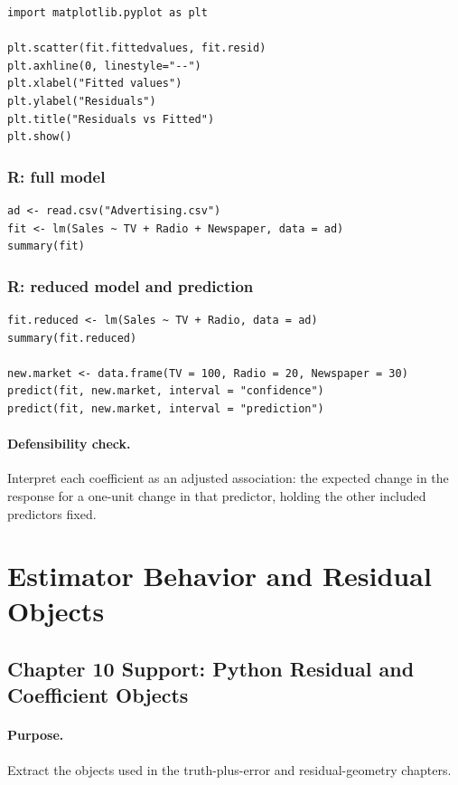 \begin{verbatim}
import matplotlib.pyplot as plt

plt.scatter(fit.fittedvalues, fit.resid)
plt.axhline(0, linestyle="--")
plt.xlabel("Fitted values")
plt.ylabel("Residuals")
plt.title("Residuals vs Fitted")
plt.show()
\end{verbatim}

\subsubsection*{R: full model}

\begin{verbatim}
ad <- read.csv("Advertising.csv")
fit <- lm(Sales ~ TV + Radio + Newspaper, data = ad)
summary(fit)
\end{verbatim}

\subsubsection*{R: reduced model and prediction}

\begin{verbatim}
fit.reduced <- lm(Sales ~ TV + Radio, data = ad)
summary(fit.reduced)

new.market <- data.frame(TV = 100, Radio = 20, Newspaper = 30)
predict(fit, new.market, interval = "confidence")
predict(fit, new.market, interval = "prediction")
\end{verbatim}

\paragraph{Defensibility check.} Interpret each coefficient as an adjusted association: the expected change in the response for a one-unit change in that predictor, holding the other included predictors fixed.

\section{Estimator Behavior and Residual Objects}
\label{app:cookbook-estimator-residual-objects}

\subsection{Chapter 10 Support: Python Residual and Coefficient Objects}
\label{app:ch10-python-software-cookbook}

\paragraph{Purpose.} Extract the objects used in the truth-plus-error and residual-geometry chapters.

